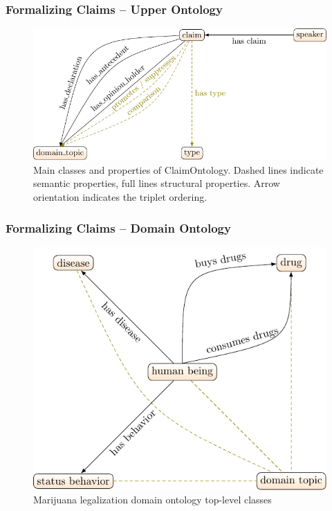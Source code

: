 \documentclass{beamer}
\begin{document}
\begin{frame}
	\frametitle{Formalizing Claims -- Upper Ontology}

\begin{figure}
	\centering
	\footnotesize
	\includegraphics[scale=0.8]{../formalizations_main_classes-figure0.pdf}
\caption{Main classes and properties of ClaimOntology. Dashed lines indicate
	semantic properties, full lines structural properties. 
	Arrow orientation indicates the
	triplet ordering. }
\end{figure}
\end{frame}

\begin{frame}
	\frametitle{Formalizing Claims -- Domain Ontology}

\begin{figure}
	\centering
	\includegraphics[scale=0.8]{../formalizations_marijuana_main_classes-figure0.pdf}
\caption{Marijuana legalization domain ontology top-level classes}
\end{figure}
\end{frame}
\end{document}
